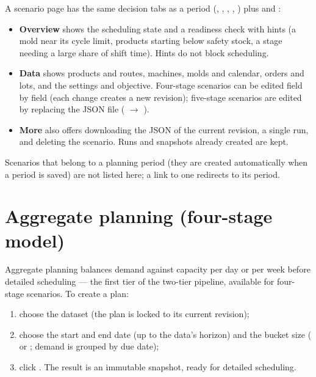 A scenario page has the same decision tabs as a period (, , ,
, ) plus  and :

\begin{itemize}
  \item \textbf{Overview} shows the scheduling state and a readiness check with hints (a mold near its cycle limit,
        products starting below safety stock, a stage needing a large share of shift time). Hints do not block
        scheduling.
  \item \textbf{Data} shows products and routes, machines, molds and calendar, orders and lots, and the settings and
        objective. Four-stage scenarios can be edited field by field (each change creates a new revision);
        five-stage scenarios are edited by replacing the JSON file ( $\rightarrow$ ).
  \item \textbf{More} also offers downloading the JSON of the current revision, a single run, and deleting the
        scenario. Runs and snapshots already created are kept.
\end{itemize}

Scenarios that belong to a planning period (they are created automatically when a period is saved) are not
listed here; a link to one redirects to its period.

\section{Aggregate planning (four-stage model)}


Aggregate planning balances demand against capacity per day or per week before detailed scheduling --- the first
tier of the two-tier pipeline, available for four-stage scenarios. To create a plan:

\begin{enumerate}
  \item choose the dataset (the plan is locked to its current revision);
  \item choose the start and end date (up to the data's horizon) and the bucket size ( or
        ; demand is grouped by due date);
  \item click . The result is an immutable snapshot, ready for detailed scheduling.
\end{enumerate}

